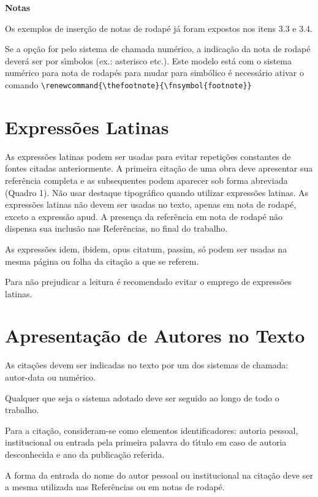 \textbf{Notas}

Os exemplos de inser\c{c}\~ao de notas de rodap\'e j\'a foram expostos nos itens 3.3 e 3.4.

Se a op\c{c}\~ao for pelo sistema de chamada num\'erico, a indica\c{c}\~ao da nota de rodap\'e dever\'a ser por s\'{\i}mbolos (ex.: asterisco etc.). 
Este modelo est\'a com o sistema num\'erico para nota de rodap\'es para mudar para simb\'olico \'e necess\'ario ativar o comando \verb+\renewcommand{\thefootnote}{\fnsymbol{footnote}}+

\section{Express\~oes Latinas}

As express\~oes latinas podem ser usadas para evitar repeti\c{c}\~oes
constantes de fontes citadas anteriormente. A primeira cita\c{c}\~ao de uma obra
deve apresentar sua refer\^encia completa e as subsequentes podem aparecer
sob forma abreviada (Quadro 1).
N\~ao usar destaque tipogr\'afico quando utilizar express\~oes latinas.
As express\~oes latinas n\~ao devem ser usadas no texto, apenas em nota
de rodap\'e, exceto a express\~ao apud.
A presen\c{c}a da refer\^encia em nota de rodap\'e n\~ao dispensa sua inclus\~ao
nas Refer\^encias, no final do trabalho.

As express\~oes idem, ibidem, opus citatum, passim, s\'o podem ser usadas na mesma p\'agina ou folha da cita\c{c}\~ao a que se referem.

Para n\~ao prejudicar a leitura \'e recomendado evitar o emprego de
express\~oes latinas.


\section{Apresenta\c{c}\~ao de Autores no Texto}

As cita\c{c}\~oes devem ser indicadas no texto por um dos sistemas de chamada: autor-data ou num\'erico.

Qualquer que seja o sistema adotado deve ser seguido ao longo de todo o trabalho. 

Para a cita\c{c}\~ao, consideram-se como elementos identificadores: autoria pessoal, institucional ou entrada pela primeira palavra do t\'{\i}tulo em caso de autoria desconhecida e ano da publica\c{c}\~ao referida.

A forma da entrada do nome do autor pessoal ou institucional na cita\c{c}\~ao deve ser a mesma utilizada nas Refer\^encias ou em notas de rodap\'e.

